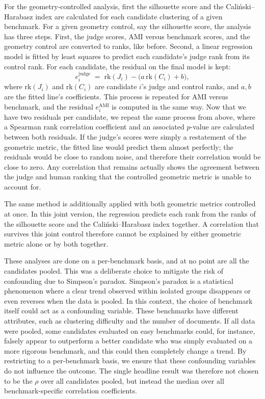 \documentclass[11pt,a4paper,oneside]{report}
\begin{document}
For the geometry-controlled analysis, first the silhouette score and the Cali\'nski--Harabasz index are calculated for each candidate clustering of a given benchmark. For a given geometry control, say the silhouette score, the analysis has three steps. First, the judge scores, AMI versus benchmark scores, and the geometry control are converted to ranks, like before. Second, a linear regression model is fitted by least squares to predict each candidate's judge rank from its control rank. For each candidate, the residual on the final model is kept:
\[
e_i^{\mathrm{judge}} \;=\; \mathrm{rk}(J_i) - \bigl(a\,\mathrm{rk}(C_i) +b\bigr),
\]
where $\mathrm{rk}(J_i)$ and $\mathrm{rk}(C_i)$ are candidate $i$'s judge and control ranks, and $a, b$ are the fitted line's coefficients. This process is repeated for AMI versus benchmark, and the residual $e_i^{\mathrm{AMI}}$ is computed in the same way. Now that we have two residuals per candidate, we repeat the same process from above, where a Spearman rank correlation coefficient and an associated $p$-value are calculated between both residuals. If the judge's scores were simply a restatement of the geometric metric, the fitted line would predict them almost perfectly; the residuals would be close to random noise, and therefore their correlation would be close to zero. Any correlation that remains actually shows the agreement between the judge and human ranking that the controlled geometric metric is unable to account for.

The same method is additionally applied with both geometric metrics controlled at once. In this joint version, the regression predicts each rank from the ranks of the silhouette score and the Cali\'nski--Harabasz index together. A correlation that survives this joint control therefore cannot be explained by either geometric metric alone or by both together.

These analyses are done on a per-benchmark basis, and at no point are all the candidates pooled. This was a deliberate choice to mitigate the risk of confounding due to Simpson's paradox. Simpson's paradox is a statistical phenomenon where a clear trend observed within isolated groups disappears or even reverses when the data is pooled. In this context, the choice of benchmark itself could act as a confounding variable. These benchmarks have different attributes, such as clustering difficulty and the number of documents. If all data were pooled, some candidates evaluated on easy benchmarks could, for instance, falsely appear to outperform a better candidate who was simply evaluated on a more rigorous benchmark, and this could then completely change a trend. By restricting to a per-benchmark basis, we ensure that these confounding variables do not influence the outcome. The single headline result was therefore not chosen to be the $\rho$ over all candidates pooled, but instead the median over all benchmark-specific correlation coefficients.
\end{document}
